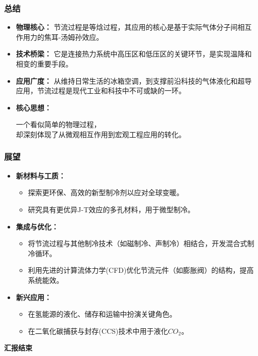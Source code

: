 \documentclass{beamer}
\begin{document}
\begin{frame}
  \frametitle{总结}
  \begin{itemize}
    \item \textbf{物理核心：} 节流过程是\alert{等焓}过程，其应用的核心是基于实际气体分子间相互作用力的\alert{焦耳-汤姆孙效应}。
    \vfill
    \item \textbf{技术桥梁：} 它是连接热力系统中\alert{高压区}和\alert{低压区}的关键环节，是实现温降和相变的重要手段。
    \vfill
    \item \textbf{应用广度：} 从维持日常生活的\alert{冰箱空调}，到支撑前沿科技的\alert{气体液化}和\alert{超导应用}，节流过程是现代工业和科技中不可或缺的一环。
    \vfill
    \item \textbf{核心思想：}
    \begin{center}
        一个看似简单的物理过程，\\
        却深刻体现了从微观相互作用到宏观工程应用的转化。
    \end{center}
  \end{itemize}
\end{frame}

\begin{frame}
    \frametitle{展望}
    \begin{itemize}
        \item \textbf{新材料与工质：}
        \begin{itemize}
            \item 探索更环保、高效的新型制冷剂以应对全球变暖。
            \item 研究具有更优异J-T效应的多孔材料，用于微型制冷。
        \end{itemize}
        \vfill
        \item \textbf{集成与优化：}
        \begin{itemize}
            \item 将节流过程与其他制冷技术（如磁制冷、声制冷）相结合，开发混合式制冷循环。
            \item 利用先进的计算流体力学(CFD)优化节流元件（如膨胀阀）的结构，提高系统能效。
        \end{itemize}
        \vfill
        \item \textbf{新兴应用：}
        \begin{itemize}
            \item 在氢能源的液化、储存和运输中扮演关键角色。
            \item 在二氧化碳捕获与封存(CCS)技术中用于液化$CO_2$。
        \end{itemize}
    \end{itemize}
\end{frame}


\begin{frame}
    \begin{center}
        \Huge\bfseries
         汇报结束
    \end{center}
\end{frame}
\end{document}
